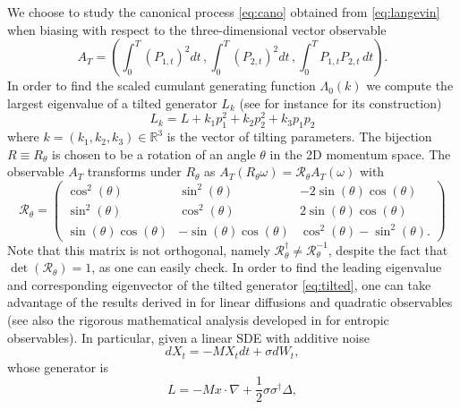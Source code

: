 \documentclass[a4paper,11pt]{article}
\numberwithin{equation}{section}
\begin{document}
We choose to study the canonical process \eqref{eq:cano} obtained from \eqref{eq:langevin}
 when biasing with respect to the three-dimensional vector observable 
\begin{equation}\label{eq:3dobs}
A_{T}=\left(\int_{0}^{T}\left(P_{1,t}\right)^{2} dt \,,\int_{0}^{T}\left(P_{2,t}\right)^{2} dt \,,\int_{0}^{T}P_{1,t}P_{2,t}  \,dt\right) .
\end{equation}
In order to find the scaled cumulant generating function $\Lambda_0(k)$ we compute the largest eigenvalue of a tilted generator $L_k$ (see for instance \cite{CT15a} for its construction) 
\begin{equation}\label{eq:tilted}
    L_k = L + k_1 p_1^2 + k_2 p_2^2 + k_3 p_1 p_2
\end{equation}
where $k=(k_1,k_2,k_3) \in \mathbb{R}^3$ is the vector of tilting parameters. The bijection $R \equiv R_\theta$ is chosen to be a rotation of an angle $\theta$ in the 2D momentum space.
The observable $A_T$ transforms under $R_\theta$ as $A_T(R_\theta \omega) = \mathcal{R}_\theta A_T(\omega)$ with 
\begin{equation}
    \mathcal{R}_\theta = 
    \begin{pmatrix}
        \cos^2(\theta) & \sin^2(\theta) & -2 \sin(\theta)\cos(\theta) \\
        \sin^2(\theta) & \cos^2(\theta) & 2 \sin(\theta)\cos(\theta) \\
        \sin(\theta)\cos(\theta) & -\sin(\theta)\cos(\theta) & \cos^2(\theta) - \sin^2(\theta).
    \end{pmatrix}
    \label{eq:Rot}
\end{equation}
Note that this matrix is not orthogonal, namely $\mathcal{R}_\theta^\dag \neq \mathcal{R}_\theta^{-1}$, despite the fact that $\det(\mathcal{R}_\theta)=1$, as one can easily check. In order to find the leading eigenvalue and corresponding eigenvector of the tilted generator \eqref{eq:tilted}, one can take advantage of the results derived in \cite{dBT23} for linear diffusions and quadratic observables (see also the rigorous mathematical analysis developed in \cite{JPS17} for entropic observables). In particular, given a linear SDE with additive noise
\begin{equation}
    d X_t = -M X_t dt + \sigma d W_t,
\end{equation}
whose generator is 
\begin{equation*}
    L= -M x \cdot \nabla  + \frac{1}{2} \sigma \sigma^\dag \Delta ,
\end{equation*}
\end{document}
